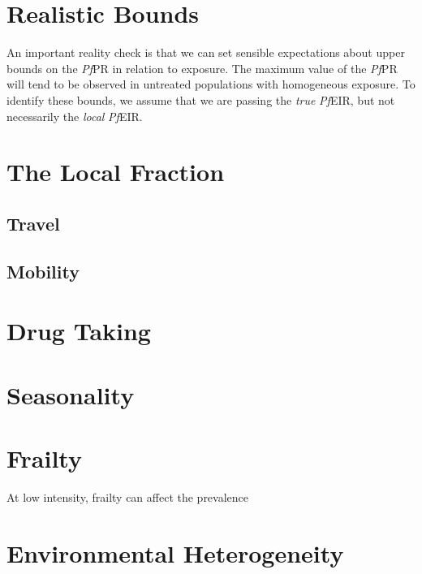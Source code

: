 \documentclass[
]{book}
\begin{document}
\hypertarget{realistic-bounds}{%
\section{Realistic Bounds}\label{realistic-bounds}}

An important reality check is that we can set sensible expectations about upper bounds on the \emph{Pf}PR in relation to exposure. The maximum value of the \emph{Pf}PR will tend to be observed in untreated populations with homogeneous exposure. To identify these bounds, we assume that we are passing the \emph{true} \emph{Pf}EIR, but not necessarily the \emph{local} \emph{Pf}EIR.

\hypertarget{the-local-fraction}{%
\section{The Local Fraction}\label{the-local-fraction}}

\hypertarget{travel-1}{%
\subsection{Travel}\label{travel-1}}

\hypertarget{mobility-1}{%
\subsection{Mobility}\label{mobility-1}}

\hypertarget{drug-taking}{%
\section{Drug Taking}\label{drug-taking}}

\hypertarget{seasonality-1}{%
\section{Seasonality}\label{seasonality-1}}

\hypertarget{frailty}{%
\section{Frailty}\label{frailty}}

At low intensity, frailty can affect the prevalence

\hypertarget{environmental-heterogeneity-1}{%
\section{Environmental Heterogeneity}\label{environmental-heterogeneity-1}}
\end{document}
